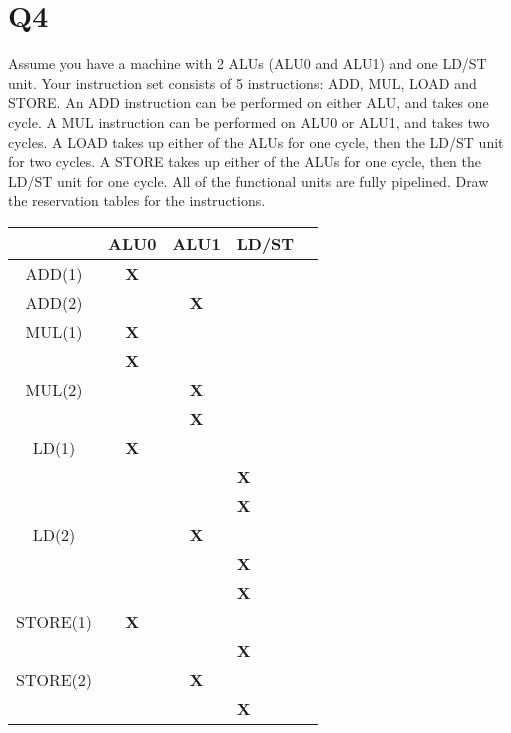 \documentclass{report}
\begin{document}
\section{Q4}
\vspace{-1em}
\begin{multicols}{2}
Assume you have a machine with 2 ALUs (ALU0 and ALU1) and one LD/ST unit.
Your instruction set consists of 5 instructions: ADD, MUL, LOAD and STORE. An
ADD instruction can be performed on either ALU, and takes one cycle. A MUL
instruction can be performed on ALU0 or ALU1, and takes two cycles. A LOAD
takes up either of the ALUs for one cycle, then the LD/ST unit for two cycles. A
STORE takes up either of the ALUs for one cycle, then the LD/ST unit for one cycle.
All of the functional units are fully pipelined. Draw the reservation tables for the
instructions.
  \vfill\columnbreak
  \begin{tabular}{|c|>{\bfseries}c|>{\bfseries}c|>{\bfseries}l|>{\bfseries}l|}
    \hline
  	& ALU0   & ALU1 & LD/ST \\
    \hline
    ADD(1)   & X &   &  \\
    \hline
    ADD(2)   &   & X &  \\
    \hline
    MUL(1)   & X &   &  \\
             & X &   &  \\
    \hline
    MUL(2)   &   & X &  \\
             &   & X &  \\
    \hline
    LD(1)    & X &   &   \\
             &   &   & X \\
             &   &   & X \\
    \hline
    LD(2)    &   & X &   \\
             &   &   & X \\
             &   &   & X \\
    \hline
    STORE(1) & X &   &   \\
             &   &   & X \\
    \hline
    STORE(2) &   & X &   \\
             &   &   & X \\
    \hline
  \end{tabular}
\end{multicols}
\end{document}
